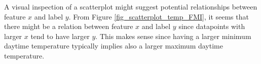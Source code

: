 \documentclass[12pt]{report}
\begin{document}
A visual inspection of a scatterplot might suggest potential relationships between feature $x$ 
and label $y$. From Figure \ref{fig_scatterplot_temp_FMI}, it seems that there might be a relation 
between feature $x$ and label $y$ since datapoints with larger $x$ tend to have larger $y$. This 
makes sense since having a larger minimum daytime temperature typically implies also a larger 
maximum daytime temperature. 


\end{document}
